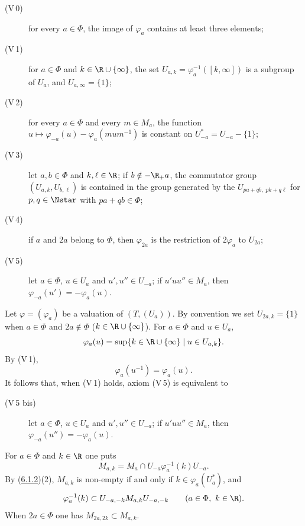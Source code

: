 \documentclass[12pt,a4paper,oneside,english]{smfart}
\makeatletter
\newcommand{\btanchor}[1]{\leavevmode\Hy@raisedlink{\hypertarget{bt:#1}{}}}
\newcommand{\btref}[1]{\hyperlink{bt:#1}{#1}}
\theoremstyle{definition}
\theoremstyle{bt}
\makeatother
\begin{document}
\begin{description}
\item[\rm (V\,0)] for every $a\in\Phi$, the image of $\varphi_a$ contains at
least three elements;
\item[\rm (V\,1)] for $a\in\Phi$ and $k\in\R\cup\{\infty\}$, the set
$U_{a,k}=\varphi_a^{-1}([k,\infty])$ is a subgroup of $U_a$, and
$U_{a,\infty}=\{1\}$;
\item[\rm (V\,2)] for every $a\in\Phi$ and every $m\in M_a$, the function
$u\mapsto\varphi_{-a}(u)-\varphi_a(mum^{-1})$ is constant on
$U^{*}_{-a}=U_{-a}-\{1\}$;
\item[\rm (V\,3)] let $a,b\in\Phi$ and $k,\ell\in\R$; if $b\notin-\R_{+}a$, the
commutator group $(U_{a,k},U_{b,\ell})$ is contained in the group generated by
the $U_{pa+qb,\;pk+q\ell}$ for $p,q\in\Nstar$ with $pa+qb\in\Phi$;
\item[\rm (V\,4)] if $a$ and $2a$ belong to $\Phi$, then $\varphi_{2a}$ is the
restriction of $2\varphi_a$ to $U_{2a}$;
\item[\rm (V\,5)] let $a\in\Phi$, $u\in U_a$ and $u',u''\in U_{-a}$; if
$u'uu''\in M_a$, then $\varphi_{-a}(u')=-\varphi_a(u)$.
\end{description}

\btanchor{6.2.2} Let $\varphi=(\varphi_a)$ be a valuation of $(T,(U_a))$. By
convention we set $U_{2a,k}=\{1\}$ when $a\in\Phi$ and $2a\notin\Phi$
($k\in\R\cup\{\infty\}$). For $a\in\Phi$ and $u\in U_a$,
\begin{equation}
\varphi_a(u)=\sup\{k\in\R\cup\{\infty\}\mid u\in U_{a,k}\}.
\end{equation}
By (V\,1),
\begin{equation}
\varphi_a(u^{-1})=\varphi_a(u).
\end{equation}
It follows that, when (V\,1) holds, axiom (V\,5) is equivalent to
\begin{description}
\item[\rm (V\,5 bis)] let $a\in\Phi$, $u\in U_a$ and $u',u''\in U_{-a}$; if
$u'uu''\in M_a$, then $\varphi_{-a}(u'')=-\varphi_a(u)$.
\end{description}

For $a\in\Phi$ and $k\in\R$ one puts
\[ M_{a,k}=M_a\cap U_{-a}\varphi_a^{-1}(k)U_{-a}. \]
By (\btref{6.1.2})(2), $M_{a,k}$ is non-empty if and only if $k\in\varphi_a(U_a^{*})$,
and
\begin{equation}
\varphi_a^{-1}(k)\subset U_{-a,-k}M_{a,k}U_{-a,-k}\qquad(a\in\Phi,\ k\in\R).
\end{equation}
When $2a\in\Phi$ one has $M_{2a,2k}\subset M_{a,k}$.
\end{document}
